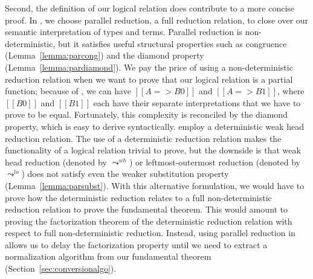 \documentclass[acmsmall,screen=true,
\ifpublic review=false\else,review=true\fi
  ,anonymous=\ifanonymous true\else false\fi]{acmart}
\begin{document}
Second, the definition of our logical relation does
contribute to a more concise proof.
In , we choose parallel reduction, a full
reduction relation, to close over our semantic interpretation of types
and terms. Parallel reduction is non-deterministic, but it satisfies
useful structural properties such as congruence
(Lemma~\ref{lemma:parcong}) and the diamond property
(Lemma~\ref{lemma:pardiamond}). We pay the price of using a
non-deterministic reduction relation when we want to prove that our
logical relation is a partial function; because of , we
can have $[[A => B0]]$ and $[[A => B1]]$, where $[[B0]]$ and $[[B1]]$
each have their separate interpretations that we have to prove to be
equal. Fortunately, this complexity is reconciled by the
diamond property, which is easy to derive syntactically.
\citet{decagda,nbeincoq} employ a deterministic weak
head reduction relation. The use of a deterministic reduction relation
makes the functionality of a logical relation trivial to prove, but
the downside is that weak head reduction (denoted by $\leadsto^{wh}$)
or leftmost-outermost reduction (denoted by $\leadsto^{lo}$) does
not satisfy even the weaker substitution property
(Lemma~\ref{lemma:parsubst}). %
With this alternative formulation, we would have to prove how the
deterministic reduction relates to a full non-deterministic reduction
relation to prove the fundamental theorem. This would amount
to proving the factorization theorem of the deterministic reduction
relation with respect to full non-deterministic reduction. Instead,
using parallel reduction in  allows us to delay the
factorization property until we need to extract a normalization
algorithm from our fundamental theorem (Section~\ref{sec:conversionalgo}).




\end{document}
